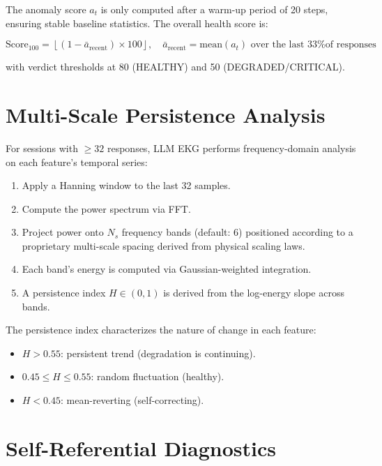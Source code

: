 \documentclass[11pt,a4paper]{article}
\begin{document}
The anomaly score $a_t$ is only computed after a warm-up period of 20 steps, ensuring stable baseline statistics. The overall health score is:

\begin{equation}
    \text{Score}_{100} = \left\lfloor (1 - \bar{a}_{\text{recent}}) \times 100 \right\rfloor, \quad \bar{a}_{\text{recent}} = \text{mean}(a_{t})\text{ over the last 33\% of responses}
\end{equation}

with verdict thresholds at 80 (HEALTHY) and 50 (DEGRADED/CRITICAL).

\section{Multi-Scale Persistence Analysis}

For sessions with $\geq 32$ responses, LLM EKG performs frequency-domain analysis on each feature's temporal series:

\begin{enumerate}[nosep]
    \item Apply a Hanning window to the last 32 samples.
    \item Compute the power spectrum via FFT.
    \item Project power onto $N_s$ frequency bands (default: 6) positioned according to a proprietary multi-scale spacing derived from physical scaling laws.
    \item Each band's energy is computed via Gaussian-weighted integration.
    \item A persistence index $H \in (0, 1)$ is derived from the log-energy slope across bands.
\end{enumerate}

The persistence index characterizes the nature of change in each feature:
\begin{itemize}[nosep]
    \item $H > 0.55$: persistent trend (degradation is continuing).
    \item $0.45 \leq H \leq 0.55$: random fluctuation (healthy).
    \item $H < 0.45$: mean-reverting (self-correcting).
\end{itemize}

\section{Self-Referential Diagnostics}
\end{document}
